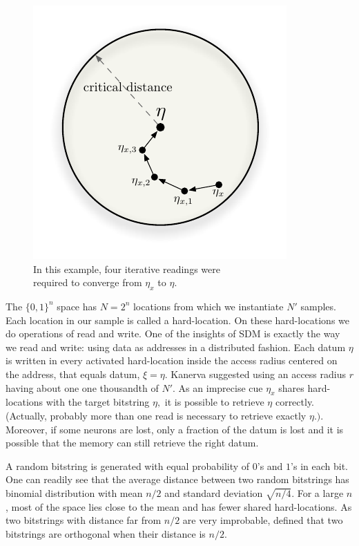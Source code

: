 \begin{figure}[!htb]
\centering\includegraphics[scale=0.75]{./images02/p1_p2_iter_read.pdf}

\caption{In this example, four iterative readings were\protect \\
required to converge from $\eta_{x}$ to $\eta$.\label{fig-p1-p2-iterative-read}}
\end{figure}


The $\{0,1\}^{n}$ space has $N=2^{n}$ locations from which we instantiate $N'$ samples. Each location in our sample is called a hard-location.  On these hard-locations we do operations of read and write. One of the insights of SDM is exactly the way we read and write: using data as addresses in a distributed fashion. Each datum $\eta$ is written in every activated hard-location inside the access radius centered on the address, that equals datum, $\xi=\eta$. Kanerva suggested using an access radius $r$ having about one one thousandth of $N'$.  As an imprecise cue $\eta_{x}$ shares hard-locations with the target bitstring $\eta,$ it is possible to retrieve $\eta$ correctly. (Actually, probably more than one read is necessary to retrieve exactly $\eta.)$.  Moreover, if some neurons are lost, only a fraction of the datum is lost and it is possible that the memory can still retrieve the right datum.

A random bitstring is generated with equal probability of $0$'s and $1$'s in each bit. One can readily see that the average distance between two random bitstrings has binomial distribution with mean $n/2$ and standard deviation $\sqrt{n/4}$. For a large $n$, most of the space lies close to the mean and has fewer shared hard-locations.  As two bitstrings with distance far from $n/2$ are very improbable, \citet{Kanerva1988} defined that two bitstrings are orthogonal when their distance is $n/2$.

